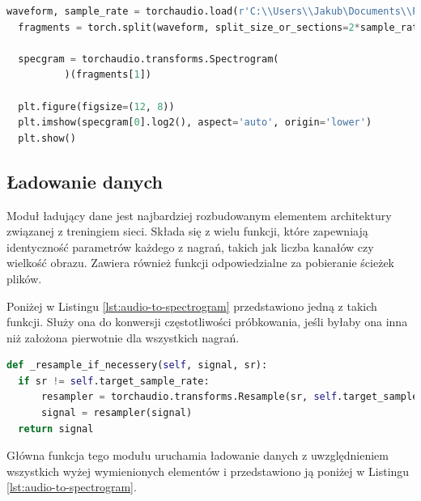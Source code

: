 \documentclass{sprz}
\begin{document}
\begin{lstlisting}[language=Python,caption={Implementacja konwersji dźwięku na spektrogram}, label={lst:audio-to-spektrogram}]
  waveform, sample_rate = torchaudio.load(r'C:\\Users\\Jakub\Documents\\PJATK\\INZ\Batmonit_model\\Chiro_sounds_signed\Audio\\PIPNAT\S4U08639_20210731_234142_PIPNAT.wav')
  fragments = torch.split(waveform, split_size_or_sections=2*sample_rate, dim=1)
  
  specgram = torchaudio.transforms.Spectrogram(
          )(fragments[1])
  
  plt.figure(figsize=(12, 8))
  plt.imshow(specgram[0].log2(), aspect='auto', origin='lower')
  plt.show()
\end{lstlisting}

\subsection{Ładowanie danych}

Moduł ładujący dane jest najbardziej rozbudowanym elementem architektury związanej z treningiem sieci. Składa się z wielu funkcji, które zapewniają identyczność parametrów każdego z nagrań, takich jak liczba kanałów czy wielkość obrazu. Zawiera również funkcji odpowiedzialne za pobieranie ścieżek plików.

Poniżej w Listingu \ref{lst:audio-to-spectrogram} przedstawiono jedną z takich funkcji. Służy ona do konwersji częstotliwości próbkowania, jeśli byłaby ona inna niż założona pierwotnie dla wszystkich nagrań.

\begin{lstlisting}[language=Python,caption={Implementacja konwersji dźwięku na spektrogram}, label={lst:audio-to-spectrogram}]
  def _resample_if_necessery(self, signal, sr):
  if sr != self.target_sample_rate:
      resampler = torchaudio.transforms.Resample(sr, self.target_sample_rate)
      signal = resampler(signal)
  return signal
\end{lstlisting}

Główna funkcja tego modułu uruchamia ładowanie danych z uwzględnieniem wszystkich wyżej wymienionych elementów i przedstawiono ją poniżej w Listingu \ref{lst:audio-to-spectrogram}.
\end{document}
